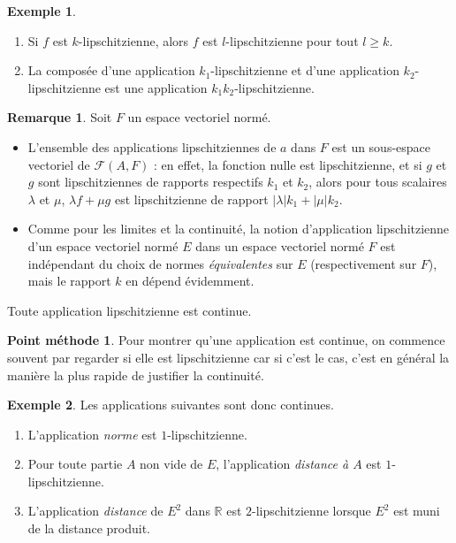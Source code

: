 \documentclass[french]{article}
\newcommand{\R}{\mathbb{R}}
\theoremstyle{plain}
\theoremstyle{definition}
\newtheorem*{ex}{Exemple}
\newtheorem*{met}{Point méthode}
\newtheorem*{rmq}{Remarque}
\theoremstyle{remark}
\begin{document}
\begin{ex}
	\begin{enumerate}
		\item Si $f$ est $k$-lipschitzienne, alors $f$ est $l$-lipschitzienne pour tout $l\geqslant k$.
		\item La composée d'une application $k_1$-lipschitzienne et d'une application $k_2$-lipschitzienne est une application $k_1k_2$-lipschitzienne.
	\end{enumerate}
\end{ex}

\begin{rmq}
	Soit $F$ un espace vectoriel normé.
	\begin{itemize}
		\item L'ensemble des applications lipschitziennes de $a$ dans $F$ est un sous-espace vectoriel de $\mathcal{F}(A,F)$ : en effet, la fonction nulle est lipschitzienne, et si $g$ et $g$ sont lipschitziennes de rapports respectifs $k_1$ et $k_2$, alors pour tous scalaires $\lambda$ et $\mu$, $\lambda f+\mu g$ est lipschitzienne de rapport $\lvert\lambda\rvert k_1+\lvert\mu\rvert k_2$.
		\item Comme pour les limites et la continuité, la notion d'application lipschitzienne d'un espace vectoriel normé $E$ dans un espace vectoriel normé $F$ est indépendant du choix de normes \textit{équivalentes} sur $E$ (respectivement sur $F$), mais le rapport $k$ en dépend évidemment.
	\end{itemize}
\end{rmq}

\begin{thm}{}%
	Toute application lipschitzienne est continue.
\end{thm}

\begin{met}
	Pour montrer qu'une application est continue, on commence souvent par regarder si elle est lipschitzienne car si c'est le cas, c'est en général la manière la plus rapide de justifier la continuité.
\end{met}

\begin{ex}
	Les applications suivantes sont donc continues.
	\begin{enumerate}
		\item L'application \textit{norme} est $1$-lipschitzienne.
		\item Pour toute partie $A$ non vide de $E$, l'application \textit{distance à $A$} est $1$-lipschitzienne.
		\item L'application \textit{distance} de $E^2$ dans $\R$ est $2$-lipschitzienne lorsque $E^2$ est muni de la distance produit.
	\end{enumerate}
\end{ex}
\end{document}

